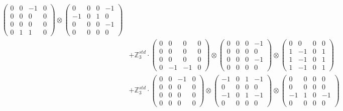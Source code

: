\documentclass{article}
\begin{document}
{\begin{align}
            \begin{pmatrix} 0 & 0 & -1 & 0 \\ 0 & 0 & 0 & 0 \\ 0 & 0 & 0 & 0 \\ 0 & 1 & 1 & 0 \end{pmatrix} \otimes 
            \begin{pmatrix} 0 & 0 & 0 & -1 \\ -1 & 0 & 1 & 0 \\ 0 & 0 & 0 & -1 \\ 0 & 0 & 0 & 0 \end{pmatrix} \\ 
        &+ \label{Rs12-Rc12-Solution-1-c18} \mathbb{Z}_3^{std} \cdot 
            \begin{pmatrix} 0 & 0 & 0 & 0 \\ 0 & 0 & 0 & 0 \\ 0 & 0 & 0 & 0 \\ 0 & -1 & -1 & 0 \end{pmatrix} \otimes 
            \begin{pmatrix} 0 & 0 & 0 & -1 \\ 0 & 0 & 0 & 0 \\ 0 & 0 & 0 & -1 \\ 0 & 0 & 0 & 0 \end{pmatrix} \otimes 
            \begin{pmatrix} 0 & 0 & 0 & 0 \\ 1 & -1 & 0 & 1 \\ 1 & -1 & 0 & 1 \\ 1 & -1 & 0 & 1 \end{pmatrix} \\ 
        &+ \label{Rs12-Rc12-Solution-1-c19} \mathbb{Z}_3^{std} \cdot 
            \begin{pmatrix} 0 & 0 & -1 & 0 \\ 0 & 0 & 0 & 0 \\ 0 & 0 & 0 & 0 \\ 0 & 0 & 0 & 0 \end{pmatrix} \otimes 
            \begin{pmatrix} -1 & 0 & 1 & -1 \\ 0 & 0 & 0 & 0 \\ -1 & 0 & 1 & -1 \\ 0 & 0 & 0 & 0 \end{pmatrix} \otimes 
            \begin{pmatrix} 0 & 0 & 0 & 0 \\ 0 & 0 & 0 & 0 \\ -1 & 1 & 0 & -1 \\ 0 & 0 & 0 & 0 \end{pmatrix} \\ 

\end{align}}
\end{document}
